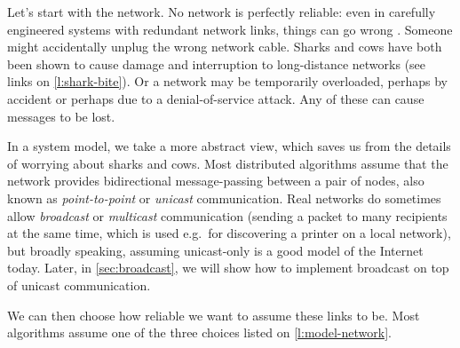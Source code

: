 Let's start with the network.
No network is perfectly reliable: even in carefully engineered systems with redundant network links, things can go wrong \citep{Bailis:2014jx}.
Someone might accidentally unplug the wrong network cable.
Sharks and cows have both been shown to cause damage and interruption to long-distance networks (see links on \autoref{l:shark-bite}).
Or a network may be temporarily overloaded, perhaps by accident or perhaps due to a denial-of-service attack.
Any of these can cause messages to be lost.

In a system model, we take a more abstract view, which saves us from the details of worrying about sharks and cows.
Most distributed algorithms assume that the network provides bidirectional message-passing between a pair of nodes, also known as \emph{point-to-point} or \emph{unicast} communication.
Real networks do sometimes allow \emph{broadcast} or \emph{multicast} communication (sending a packet to many recipients at the same time, which is used e.g.\ for discovering a printer on a local network), but broadly speaking, assuming unicast-only is a good model of the Internet today.
Later, in \autoref{sec:broadcast}, we will show how to implement broadcast on top of unicast communication.

We can then choose how reliable we want to assume these links to be.
Most algorithms assume one of the three choices listed on \autoref{l:model-network}.

